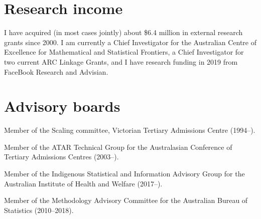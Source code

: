 \documentclass[a4paper,10pt]{article}
\begin{document}
\section{Research income}

I have acquired (in most cases jointly) about \$6.4 million in external research grants since 2000. I am currently a Chief Investigator for the Australian Centre of Excellence for Mathematical and Statistical Frontiers,  a Chief Investigator for two current ARC Linkage Grants, and I have research funding in 2019 from FaceBook Research and Advisian.

\section{Advisory boards}

\begin{compactitem}
\item
  Member of the Scaling committee, Victorian Tertiary Admissions Centre (1994--). %
\item
  Member of the ATAR Technical Group for the Australasian Conference of Tertiary Admissions Centres (2003--).
\item
  Member of the Indigenous Statistical and Information Advisory Group for the Australian Institute of Health and Welfare (2017--).
\item
  Member of the Methodology Advisory Committee for the Australian Bureau of Statistics (2010--2018).
\end{compactitem}


\enlargethispage*{0.5cm}

\end{document}
